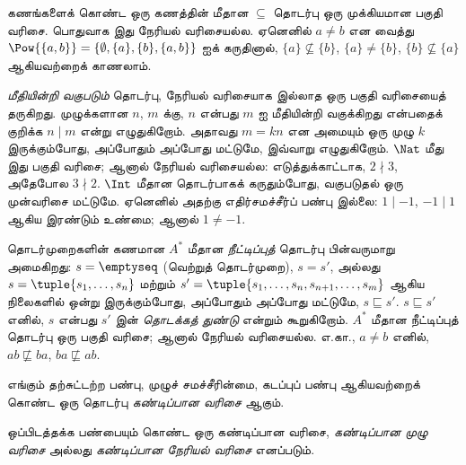 \documentclass[../../../include/open-logic-section]{subfiles}
\begin{document}
\begin{ex}
கணங்களைக் கொண்ட ஒரு கணத்தின் மீதான $\subseteq$ தொடர்பு ஒரு முக்கியமான
பகுதி வரிசை. பொதுவாக இது நேரியல் வரிசையல்ல. ஏனெனில் $a \neq b$
என வைத்து $\Pow{\{a, b\}} = \{\emptyset, \{a\}, \{b\}, \{a,b\}\}$
ஐக் கருதினால், $\{a\} \nsubseteq \{b\}$, $\{a\} \neq \{b\}$,
$\{b\} \nsubseteq \{a\}$ ஆகியவற்றைக் காணலாம்.
\end{ex}

\begin{ex}
\emph{மீதியின்றி வகுபடும்} தொடர்பு, நேரியல் வரிசையாக இல்லாத ஒரு பகுதி
வரிசையைத் தருகிறது. முழுக்களான $n$, $m$ க்கு, $n$ என்பது $m$ ஐ
மீதியின்றி வகுக்கிறது என்பதைக் குறிக்க $n \mid m$ என்று எழுதுகிறோம்.
அதாவது $m = kn$ என அமையும் ஒரு முழு $k$ இருக்கும்போது,
அப்போதும் அப்போது மட்டுமே, இவ்வாறு எழுதுகிறோம். $\Nat$ மீது இது
பகுதி வரிசை; ஆனால் நேரியல் வரிசையல்ல: எடுத்துக்காட்டாக, $2 \nmid 3$,
அதேபோல $3 \nmid 2$. $\Int$ மீதான தொடர்பாகக் கருதும்போது, வகுபடுதல்
ஒரு முன்வரிசை மட்டுமே. ஏனெனில் அதற்கு எதிர்சமச்சீர்ப் பண்பு இல்லை:
$1 \mid -1$, $-1 \mid 1$ ஆகிய இரண்டும் உண்மை; ஆனால் $1 \neq -1$.
\end{ex}

\begin{ex}
தொடர்முறைகளின் கணமான $A^*$ மீதான \emph{நீட்டிப்புத்} தொடர்பு
பின்வருமாறு அமைகிறது: $s = \emptyseq$ (வெற்றுத் தொடர்முறை), $s = s'$,
அல்லது $s = \tuple{s_1, \dots, s_n}$ மற்றும் $s' =
\tuple{s_1, \dots, s_n, s_{n+1}, \dots, s_m}$ ஆகிய நிலைகளில் ஒன்று
இருக்கும்போது, அப்போதும் அப்போது மட்டுமே, $s \sqsubseteq s'$.
$s \sqsubseteq s'$ எனில், $s$ என்பது $s'$ இன் \emph{தொடக்கத் துண்டு}
என்றும் கூறுகிறோம். $A^*$ மீதான நீட்டிப்புத் தொடர்பு ஒரு பகுதி வரிசை;
ஆனால் நேரியல் வரிசையல்ல. எ.கா., $a \neq b$ எனில்,
$ab \not\sqsubseteq ba$, $ba \not\sqsubseteq ab$.
\end{ex}

\begin{defn}[கண்டிப்பான வரிசை]
எங்கும் தற்சுட்டற்ற பண்பு, முழுச் சமச்சீரின்மை, கடப்புப் பண்பு ஆகியவற்றைக்
கொண்ட ஒரு தொடர்பு \emph{கண்டிப்பான வரிசை} ஆகும்.
\end{defn}

\begin{defn}[கண்டிப்பான நேரியல் வரிசை]
ஒப்பிடத்தக்க பண்பையும் கொண்ட ஒரு கண்டிப்பான வரிசை,
\emph{கண்டிப்பான முழு வரிசை} அல்லது \emph{கண்டிப்பான நேரியல் வரிசை}
எனப்படும்.
\end{defn}
\end{document}
